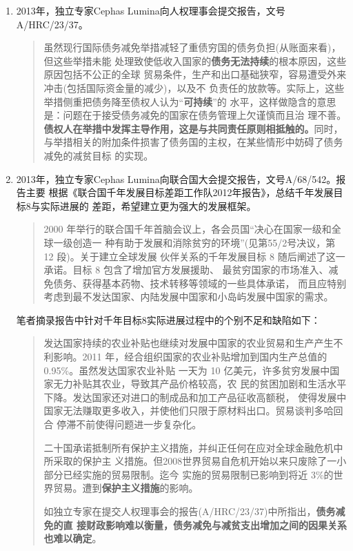 \begin{enumerate}
\item 2013年，独立专家Cephas Lumina向人权理事会提交报告，文号A/HRC/23/37。
  \begin{quotation}
    虽然现行国际债务减免举措减轻了重债穷国的债务负担(从账面来看)，但这些举措未能
    处理致使低收入国家的\textbf{债务无法持续}的根本原因，这些原因包括不公正的全球
    贸易条件，生产和出口基础狭窄，容易遭受外来冲击(包括国际资金量的减少)，以及不
    负责任的放款等。实际上，这些举措侧重把债务降至债权人认为“\textbf{可持续}”的
    水平，这样做隐含的意思是：问题在于接受债务减免的国家在债务管理上欠谨慎而且治
    理不善。\textbf{债权人在举措中发挥主导作用，这是与共同责任原则相抵触的。}同时，
    与举措相关的附加条件损害了债务国的主权，在某些情形中妨碍了债务减免的减贫目标
    的实现。
  \end{quotation}

\item 2013年，独立专家Cephas Lumina向联合国大会提交报告，文号A/68/542。报告主要
  根据《联合国千年发展目标差距工作队2012年报告》，总结千年发展目标8与实际进展的
  差距，希望建立更为强大的发展框架。
  \begin{quotation}
     2000 年举行的联合国千年首脑会议上，各会员国“决心在国家一级和全球一级创造一
     种有助于发展和消除贫穷的环境”(见第55/2号决议，第 12 段)。关于建立全球发展
     伙伴关系的千年发展目标 8 随后阐述了这一承诺。目标 8 包含了增加官方发展援助、
     最贫穷国家的市场准入、减免债务、获得基本药物、技术转移等领域的一些具体承诺，
     而且应特别考虑到最不发达国家、内陆发展中国家和小岛屿发展中国家的需求。
   \end{quotation}
   笔者摘录报告中针对千年目标8实际进展过程中的个别不足和缺陷如下：
   \begin{quotation}
     发达国家持续的农业补贴也继续对发展中国家的农业贸易和生产产生不利影响。2011
     年，经合组织国家的农业补贴增加到国内生产总值的 0.95\%。虽然发达国家农业补贴
     一天为 10 亿美元，许多贫穷发展中国家无力补贴其农业，导致其产品价格较高，农
     民的贫困加剧和生活水平下降。发达国家还对进口的制成品和加工产品征收高额税，
     使得发展中国家无法赚取更多收入，并使他们只限于原材料出口。贸易谈判多哈回合
     停滞不前使得问题进一步复杂化。

     二十国承诺抵制所有保护主义措施，并纠正任何在应对全球金融危机中所采取的保护主
     义措施。但2008世界贸易自危机开始以来只废除了一小部分已经实施的贸易限制。迄今
     实施的贸易限制已影响到将近 3\%的世界贸易。遭到\textbf{保护主义措施}的影响。

     如独立专家在提交人权理事会的报告(A/HRC/23/37)中所指出，\textbf{债务减免的直
       接财政影响难以衡量，债务减免与减贫支出增加之间的因果关系也难以确定}。


\end{quotation}
\end{enumerate}
